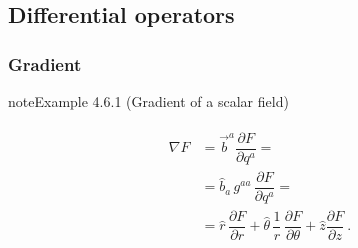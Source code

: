 \documentclass[letterpaper,10pt,english]{jupyterBook}
\begin{document}
\subsection{Differential operators}
\label{\detokenize{ch/tensor-algebra-calculus/calculus-euclidean-cylindrical:differential-operators}}\label{\detokenize{ch/tensor-algebra-calculus/calculus-euclidean-cylindrical:tensor-calculus-cylindrical-differential-operators}}

\subsubsection{Gradient}
\label{\detokenize{ch/tensor-algebra-calculus/calculus-euclidean-cylindrical:gradient}}\label{\detokenize{ch/tensor-algebra-calculus/calculus-euclidean-cylindrical:tensor-calculus-cylindrical-differential-operators-gradient}}\label{ch/tensor-algebra-calculus/calculus-euclidean-cylindrical:example-0}
\begin{sphinxadmonition}{note}{Example 4.6.1 (Gradient of a scalar field)}


\begin{equation*}
\begin{split}\begin{aligned}
  \nabla F 
  & = \vec{b}^a \dfrac{\partial F}{\partial q^a} = \\
  & = \hat{b}_a \, g^{aa} \, \dfrac{\partial F}{\partial q^a} = \\
  & = \hat{r} \, \dfrac{\partial F}{\partial  r} 
    + \hat{\theta} \, \dfrac{1}{r} \, \dfrac{\partial F}{\partial \theta}  
    + \hat{z} \dfrac{\partial F}{\partial z} \ . 
\end{aligned}\end{split}
\end{equation*}\end{sphinxadmonition}
\label{ch/tensor-algebra-calculus/calculus-euclidean-cylindrical:example-1}
\end{document}
